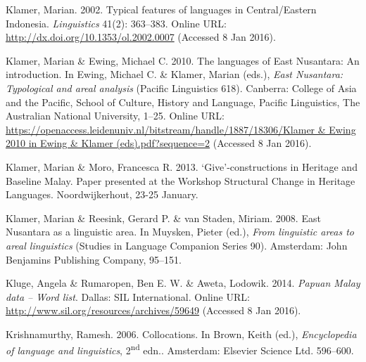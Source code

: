 \begin{styleCitaviBibliographyEntry}
Klamer, Marian. 2002. Typical features of  languages in Central/Eastern Indonesia. \textit{ Linguistics} 41(2): 363–383. Online URL: \url{http://dx.doi.org/10.1353/ol.2002.0007} (Accessed 8 Jan 2016).
\end{styleCitaviBibliographyEntry}

\begin{styleCitaviBibliographyEntry}
Klamer, Marian \& Ewing, Michael C. 2010. The languages of East Nusantara: An introduction. In Ewing, Michael C. \& Klamer, Marian (eds.), \textit{East Nusantara: Typological and areal analysis} (Pacific Linguistics 618). Canberra: College of Asia and the Pacific, School of Culture, History and Language, Pacific Linguistics, The Australian National University, 1–25. Online URL: \url{https://openaccess.leidenuniv.nl/bitstream/handle/1887/18306/Klamer & Ewing 2010 in Ewing & Klamer (eds).pdf?sequence=2} (Accessed 8 Jan 2016).
\end{styleCitaviBibliographyEntry}

\begin{styleCitaviBibliographyEntry}
Klamer, Marian \& Moro, Francesca R. 2013. ‘Give’-constructions in Heritage and Baseline Malay. Paper presented at the Workshop Structural Change in Heritage Languages. Noordwijkerhout, 23-25 January.
\end{styleCitaviBibliographyEntry}

\begin{styleCitaviBibliographyEntry}
Klamer, Marian \& Reesink, Gerard P. \& van Staden, Miriam. 2008. East Nusantara as a linguistic area. In Muysken, Pieter (ed.), \textit{From linguistic areas to areal linguistics} (Studies in Language Companion Series 90). Amsterdam: John Benjamins Publishing Company, 95–151.
\end{styleCitaviBibliographyEntry}

\begin{styleCitaviBibliographyEntry}
Kluge, Angela \& Rumaropen, Ben E. W. \& Aweta, Lodowik. 2014. \textit{Papuan Malay data – Word list}. Dallas: SIL International. Online URL: \url{http://www.sil.org/resources/archives/59649} (Accessed 8 Jan 2016).
\end{styleCitaviBibliographyEntry}

\begin{styleCitaviBibliographyEntry}
Krishnamurthy, Ramesh. 2006. Collocations. In Brown, Keith (ed.), \textit{Encyclopedia of language and linguistics}, 2\textsuperscript{nd} edn.. Amsterdam: Elsevier Science Ltd. 596–600.
\end{styleCitaviBibliographyEntry}

